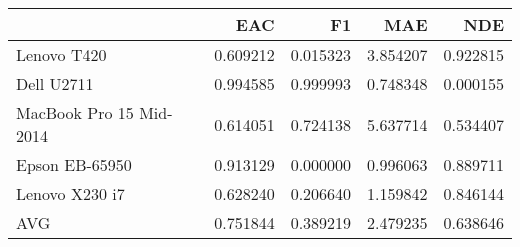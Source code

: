 \begin{tabular}{lrrrr}
\toprule
{} &       EAC &        F1 &       MAE &       NDE \\
\midrule
Lenovo T420             &  0.609212 &  0.015323 &  3.854207 &  0.922815 \\
Dell U2711              &  0.994585 &  0.999993 &  0.748348 &  0.000155 \\
MacBook Pro 15 Mid-2014 &  0.614051 &  0.724138 &  5.637714 &  0.534407 \\
Epson EB-65950          &  0.913129 &  0.000000 &  0.996063 &  0.889711 \\
Lenovo X230 i7          &  0.628240 &  0.206640 &  1.159842 &  0.846144 \\
AVG                     &  0.751844 &  0.389219 &  2.479235 &  0.638646 \\
\bottomrule
\end{tabular}
